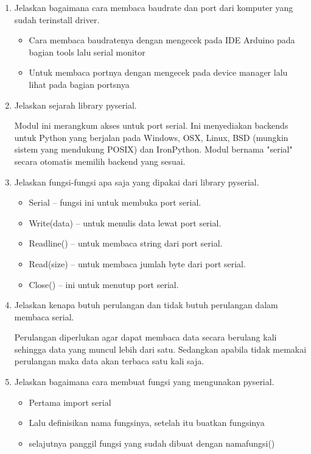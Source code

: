 \begin{enumerate}
    \item Jelaskan bagaimana cara membaca baudrate dan port dari komputer yang sudah terinstall driver.
    \begin{itemize}
        \item Cara membaca baudratenya dengan mengecek pada IDE Arduino pada bagian tools lalu serial monitor
        \item Untuk membaca portnya dengan mengecek pada device manager lalu lihat pada bagian portsnya
    \end{itemize}
    
    \item Jelaskan sejarah library pyserial.
    \par Modul ini merangkum akses untuk port serial. Ini menyediakan backends untuk Python yang berjalan pada Windows, OSX, Linux, BSD (mungkin sistem yang mendukung POSIX) dan IronPython. Modul bernama "serial" secara otomatis memilih backend yang sesuai.
    
    \item Jelaskan fungsi-fungsi apa saja yang dipakai dari library pyserial.
    \begin{itemize}
        \item Serial – fungsi ini untuk membuka port serial.
        \item Write(data) – untuk menulis data lewat port serial.
        \item Readline() – untuk membaca string dari port serial.
        \item Read(size) – untuk membaca jumlah byte dari port serial.
        \item Close() – ini untuk menutup port serial.
    \end{itemize}
    
    \item Jelaskan kenapa butuh perulangan dan tidak butuh perulangan dalam membaca serial.
    \par Perulangan diperlukan agar dapat membaca data secara berulang kali sehingga data yang muncul lebih dari satu. Sedangkan apabila tidak memakai perulangan maka data akan terbaca satu kali saja.
    
    \item Jelaskan bagaimana cara membuat fungsi yang mengunakan pyserial.
    \begin{itemize}
        \item Pertama import serial
        \item Lalu definisikan nama fungsinya, setelah itu buatkan fungsinya
        \item selajutnya panggil fungsi yang sudah dibuat dengan namafungsi()
    \end{itemize}
    

\end{enumerate}
